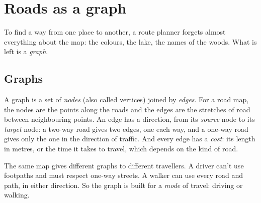 \chapter{Roads as a graph}\label{ch:graph}

To find a way from one place to another, a route planner forgets almost
everything about the map: the colours, the lake, the names of the woods.
What is left is a \emph{graph}.

\section{Graphs}

A graph is a set of \emph{nodes} (also called vertices) joined by
\emph{edges}. For a road map, the nodes are the points along the roads and
the edges are the stretches of road between neighbouring points. An edge
has a direction, from its \emph{source} node to its \emph{target} node: a
two-way road gives two edges, one each way, and a one-way road gives only
the one in the direction of traffic. And every edge has a \emph{cost}:
its length in metres, or the time it takes to travel, which depends on the
kind of road.

\begin{center}
\end{center}

The same map gives different graphs to different travellers. A driver
can't use footpaths and must respect one-way streets. A walker can use
every road and path, in either direction. So the graph is built for a
\emph{mode} of travel: driving or walking.

